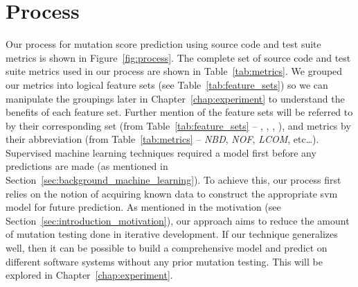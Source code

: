 \section{Process}
\label{sec:approach_process}
Our process for mutation score prediction using source code and test suite metrics is shown in Figure~\ref{fig:process}. The complete set of source code and test suite metrics used in our process are shown in Table~\ref{tab:metrics}. We grouped our metrics into logical feature sets (see Table~\ref{tab:feature_sets}) so we can manipulate the groupings later in Chapter~\ref{chap:experiment} to understand the benefits of each feature set. Further mention of the feature sets will be referred to by their corresponding set (from Table~\ref{tab:feature_sets} -- , , , ), and metrics by their abbreviation (from Table~\ref{tab:metrics} -- \emph{NBD}, \emph{NOF}, \emph{LCOM}, etc\ldots). Supervised machine learning techniques required a model first before any predictions are made (as mentioned in Section~\ref{sec:background_machine_learning}). To achieve this, our process first relies on the notion of acquiring known data to construct the appropriate \gls{svm} model for future prediction. As mentioned in the motivation (see Section~\ref{sec:introduction_motivation}), our approach aims to reduce the amount of mutation testing done in iterative development. If our technique generalizes well, then it can be possible to build a comprehensive model and predict on different software systems without any prior mutation testing. This will be explored in Chapter~\ref{chap:experiment}.

